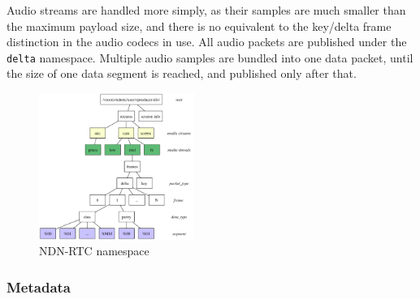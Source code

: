 \documentclass{icn/sig-alternate-2013} %
\newcommand{\ndnrtcName}{NDN-RTC} %
\begin{document}
Audio streams are handled more simply, as their samples are much smaller than the maximum payload size, and there is no equivalent to the key/delta frame distinction in the audio codecs in use. All audio packets are published under the \texttt{delta} namespace. Multiple audio samples are bundled into one data packet, until the size of one data segment is reached, and published only after that.

\begin{figure}[t!]
\centering
\includegraphics[width=0.45\textwidth]{namespace}
\caption{\ndnrtcName{} namespace}
\label{fig:namespace}
\end{figure}

\subsubsection{Metadata} 
\end{document}
